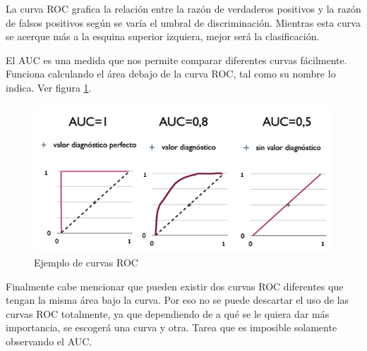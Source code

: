 La curva ROC grafica la relación entre la razón de verdaderos positivos y la razón de falsos positivos según se varía el umbral de discriminación. Mientras esta curva se acerque más a la esquina superior izquiera, mejor será la clasificación.

El \ac{AUC} es una medida que nos permite comparar diferentes curvas fácilmente. Funciona calculando el área debajo de la curva ROC, tal como su nombre lo indica. Ver figura \ref{fig:eg-roc}.

\begin{figure}[htbp]
	\centering
	\includegraphics[width=0.8\linewidth]{graficos/eg_roc.png}
	\caption{Ejemplo de curvas ROC \citep{wiki:roc_figure}}
	\label{fig:eg-roc}
\end{figure}

Finalmente cabe mencionar que pueden existir dos curvas ROC diferentes que tengan la misma área bajo la curva. Por eso no se puede descartar el uso de las curvas ROC totalmente, ya que dependiendo de a qué se le quiera dar más importancia, se escogerá una curva y otra. Tarea que es imposible solamente observando el \ac{AUC}.






